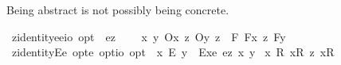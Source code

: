 \begin{isabellebody}
\begin{isamarkuptext}%
Being abstract is not possibly being concrete.%
\end{isamarkuptext}%
\isamarkuptrue%
\isamarkupfalse%
\ z{\isacharunderscore}identity{\isacharcolon}{\isacharcolon}{\isachardoublequoteopen}{\isacharparenleft}e{\isasymRightarrow}e{\isasymRightarrow}io{\isacharparenright}\ opt{\isachardoublequoteclose}\ \ {\isachardoublequoteopen}{\isacharequal}\isactrlsub e\isactrlsup z\ {\isasymequiv}\ \isanewline
\ \ {\isasymlambda}x\ y{\isachardot}\ {\isacharparenleft}{\isacharparenleft}{\isacharless}O\isactrlsup {\isacharbang}{\isasymbullet}{\isachardot}x{\isachardot}{\isachargreater}\ {\isasymand}\isactrlsup z\ {\isacharless}O\isactrlsup {\isacharbang}{\isasymbullet}{\isachardot}y{\isachardot}{\isachargreater}{\isacharparenright}\ {\isasymand}\isactrlsup z\ {\isasymbox}\ {\isacharparenleft}{\isasymforall}{\isacharparenleft}{\isasymlambda}F{\isachardot}\ {\isacharless}{\isachardot}F{\isachardot}{\isasymbullet}{\isachardot}x{\isachardot}{\isachargreater}\ {\isasymequiv}\isactrlsup z\ {\isacharless}{\isachardot}F{\isachardot}{\isasymbullet}{\isachardot}y{\isachardot}{\isachargreater}{\isacharparenright}{\isacharparenright}{\isacharparenright}{\isacharparenright}{\isachardoublequoteclose}\isanewline
\isanewline
{}\isamarkupfalse%
\ z{\isacharunderscore}identityE{\isacharcolon}{\isacharcolon}{\isachardoublequoteopen}{\isacharparenleft}e\ opt{\isasymRightarrow}e\ opt{\isasymRightarrow}io\ opt{\isacharparenright}{\isachardoublequoteclose}\ \ {\isachardoublequoteopen}x\ {\isacharequal}\isactrlsub E\ y\ {\isasymequiv}\ {\isacharparenleft}Exe{}\ {\isacharequal}\isactrlsub e\isactrlsup z\ x\ y{\isacharparenright}{\isachardoublequoteclose}%
\isamarkuptrue%
\isamarkupfalse%
\ {\isachardoublequoteopen}{\isacharbrackleft}{\isasymforall}{\isacharparenleft}{\isasymlambda}x{\isachardot}\ {\isasymexists}{\isacharparenleft}{\isasymlambda}R{\isachardot}\ {\isacharparenleft}{\isacharless}{\isachardot}x{\isachardot}{\isasymcirc}{\isachardot}R{\isachardot}{\isachargreater}\ {\isasymrightarrow}\isactrlsup z\ {\isacharless}{\isachardot}x{\isachardot}{\isasymcirc}R{}{\isachargreater}{\isacharparenright}{\isacharparenright}{\isacharparenright}{\isacharbrackright}{\isachardoublequoteclose}%
\isadelimproof
\ %
\endisadelimproof
%
\isatagproof
{}\isamarkupfalse%

\end{isabellebody}
